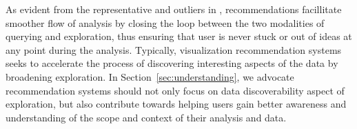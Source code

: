 \par As evident from the representative and outliers in \zv, recommendations facillitate smoother flow of analysis by closing the loop between the two modalities of querying and exploration, thus ensuring that user is never stuck or out of ideas at any point during the analysis. Typically, visualization recommendation systems seeks to accelerate the process of discovering interesting aspects of the data by broadening exploration. In Section~\ref{sec:understanding}, we advocate recommendation systems should not only focus on data discoverability aspect of exploration, but also contribute towards helping users gain better awareness and understanding of the scope and context of their analysis and data.

